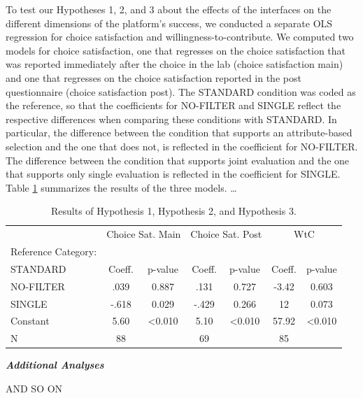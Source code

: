 To test our Hypotheses 1, 2, and 3 about the effects of the interfaces on the
different dimensions of the platform’s success, we conducted a separate OLS
regression for choice satisfaction and willingness-to-contribute. We computed
two models for choice satisfaction, one that regresses on the choice
satisfaction that was reported immediately after the choice in the lab (choice
satisfaction main) and one that regresses on the choice satisfaction reported
in the post questionnaire (choice satisfaction post). The STANDARD condition
was coded as the reference, so that the coefficients for NO-FILTER and SINGLE
reflect the respective differences when comparing these conditions with
STANDARD. In particular, the difference between the condition that supports an
attribute-based selection and the one that does not, is reflected in the
coefficient for NO-FILTER. The difference between the condition that supports
joint evaluation and the one that supports only single evaluation is reflected
in the coefficient for SINGLE. Table \ref{tab:hypothesis_results}
summarizes the results of the three models. … \\
\begin{table}[h]
    \centering
    \begin{tabular}{l c c c c c c}
        \hline
        & \multicolumn{2}{c}{Choice Sat. Main} & \multicolumn{2}{c}{Choice Sat. Post} & \multicolumn{2}{c}{WtC} \\
        Reference Category:\\ STANDARD & Coeff. & p-value & Coeff. & p-value & Coeff. & p-value \\
        \hline
        NO-FILTER & .039 & 0.887 & .131 & 0.727 & -3.42 & 0.603 \\
        SINGLE & -.618 & 0.029 & -.429 & 0.266 & 12 & 0.073 \\
        Constant & 5.60 & <0.010 & 5.10 & <0.010 & 57.92 & <0.010 \\
        N & 88 &  & 69 &  & 85 &  \\
        \hline
    \end{tabular}
    \caption{Results of Hypothesis 1, Hypothesis 2, and Hypothesis 3.}
    \label{tab:hypothesis_results}
\end{table}
\textbf{\textit{Additional Analyses}}

AND SO ON




